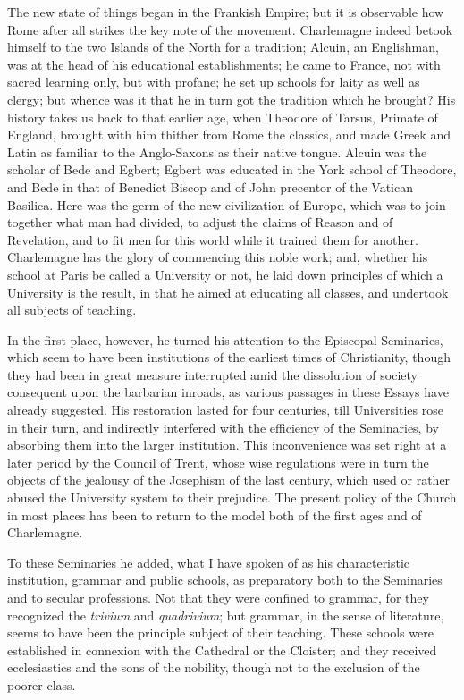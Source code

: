 The new state of things began
in the Frankish Empire; but it is observable how Rome after all
strikes the key note of the movement. Charlemagne indeed betook
himself to the two Islands of the North for a tradition; Alcuin, an
Englishman, was at the head of his educational establishments; he came
to France, not with sacred learning only, but with profane; he set up
schools for laity as well as clergy; but whence was it that he in turn
got the tradition which he brought? His history takes us back to that
earlier age, when Theodore of Tarsus, Primate of England, brought with
him thither from Rome the classics, and made Greek and Latin as
familiar to the Anglo-Saxons as their native tongue. Alcuin was the
scholar of Bede and Egbert; Egbert was educated in the York school of
Theodore, and Bede in that of Benedict Biscop and of John precentor of
the Vatican Basilica. Here was the germ of the new civilization of
Europe, which was to join together what man had divided, to adjust the
claims of Reason and of Revelation, and to fit men for this world
while it trained them for another. Charlemagne has the glory of
commencing this noble work; and, whether his school at Paris be called
a University or not, he laid down principles of which a University is
the result, in that he aimed at educating all classes, and undertook
all subjects of teaching.

In the first place, however,
he turned his attention to the Episcopal Seminaries, which seem to
have been institutions of the earliest times of Christianity, though
they had been in great measure interrupted amid the dissolution of
society consequent upon the barbarian inroads, as various passages in
these Essays have already suggested. His restoration lasted for four
centuries, till Universities rose in their turn, and indirectly
interfered with the efficiency of the Seminaries, by absorbing them
into the larger institution. This inconvenience was set right at a
later period by the Council of Trent, whose wise regulations were in
turn the objects of the jealousy of the Josephism of the last century,
which used or rather abused the University system to their prejudice.
The present policy of the Church in most places has been to return to
the model both of the first ages and of Charlemagne.

To these Seminaries he added,
what I have spoken of as his characteristic institution, grammar and
public schools, as preparatory both to the Seminaries and to secular
professions. Not that they were confined to grammar, for they
recognized the \emph{trivium} and \emph{quadrivium}; but grammar, in
the sense of literature, seems to have been the principle subject of
their teaching. These schools were established in connexion with the
Cathedral or the Cloister; and they received ecclesiastics and the
sons of the nobility, though not to the exclusion of the poorer class.

